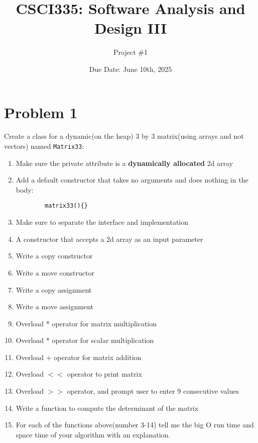 \documentclass[a4paper]{article}
\title{CSCI335: Software Analysis and Design III}
\author{Project \#1}
\date{Due Date: June 10th, 2025}
\begin{document}
\maketitle


\section*{Problem 1}
Create a class for a dynamic(on the heap) 3 by 3 matrix(using arrays and not vectors) named \texttt{Matrix33}:
\begin{enumerate}
    \item Make sure the private attribute is a \textbf{dynamically allocated} 2d array
    \item Add a default constructor that takes no arguments and does nothing in the body: \begin{verbatim}
        matrix33(){}
    \end{verbatim}
    \item Make sure to separate the interface and implementation
    \item A constructor that accepts a 2d array as an input parameter
    \item Write a copy constructor
    \item Write a move constructor
    \item Write a copy assignment 
    \item Write a move assignment
    \item Overload * operator for matrix multiplication
    \item Overload * operator for scalar multiplication
    \item Overload + operator for matrix addition
    \item Overload $<<$ operator to print matrix
    \item Overload $>>$ operator, and prompt user to enter 9 consecutive values
    \item Write a function to compute the determinant of the matrix
    \item For each of the functions above(number 3-14) tell me the big O run time and space time of your algorithm with an explanation. 
\end{enumerate}
\newpage
\end{document}
